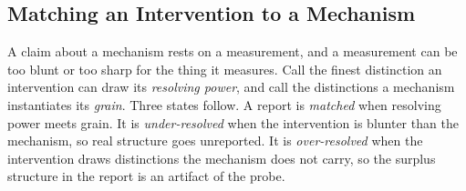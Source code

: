 
%
%

\subsection{Matching an Intervention to a Mechanism}
\label{sec:resolution}

A claim about a mechanism rests on a measurement, and a measurement can be too
blunt or too sharp for the thing it measures.  Call the finest distinction an
intervention can draw its \emph{resolving power}, and call the distinctions a
mechanism instantiates its \emph{grain}.  Three states follow.  A report is
\emph{matched} when resolving power meets grain.  It is \emph{under-resolved}
when the intervention is blunter than the mechanism, so real structure goes
unreported.  It is \emph{over-resolved} when the intervention draws distinctions
the mechanism does not carry, so the surplus structure in the report is an
artifact of the probe.


